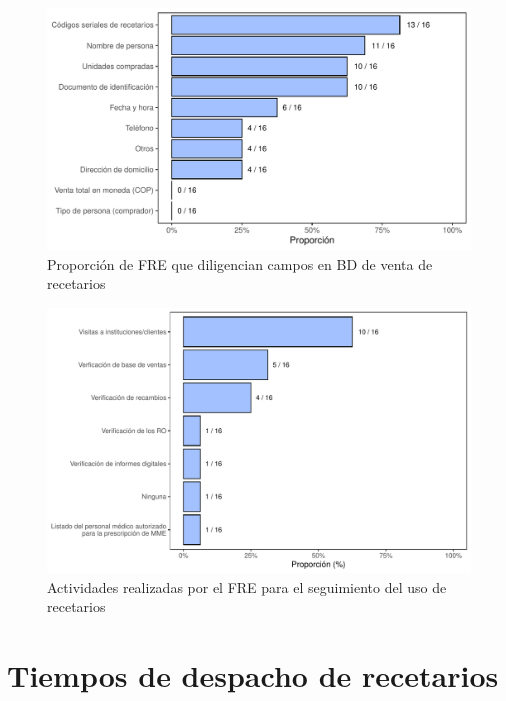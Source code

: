\documentclass[
]{book}
\begin{document}
\begin{figure}
\includegraphics[width=0.85\linewidth]{InformeFinal_files/figure-latex/BD-diligBDRecet-1} \caption{Proporción de FRE que diligencian campos en BD de venta de recetarios}\label{fig:BD-diligBDRecet}
\end{figure}

\begin{figure}
\includegraphics[width=0.85\linewidth]{InformeFinal_files/figure-latex/SeguimientoUsoRecetarios-1} \caption{Actividades realizadas por el FRE para el seguimiento del uso de recetarios}\label{fig:SeguimientoUsoRecetarios}
\end{figure}

\hypertarget{tiempos-de-despacho-de-recetarios}{%
\section{Tiempos de despacho de recetarios}\label{tiempos-de-despacho-de-recetarios}}
\end{document}
